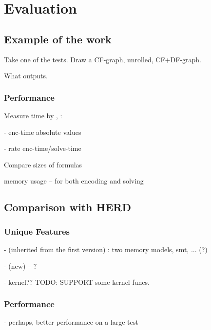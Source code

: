 \chapter{Evaluation}
\label{ch:eval}


\section{Example of the work}
Take one of the tests. Draw a CF-graph, unrolled, CF+DF-graph.

What outputs.


\subsection{Performance}

Measure time by \porthos[1], \porthos[2]:

- enc-time absolute values

- rate enc-time/solve-time


Compare sizes of formulas


memory usage -- for both encoding and solving




\section{Comparison with HERD}

\subsection{Unique Features}

- (inherited from the first version) : two memory models, smt, ... (?)

- (new) -- ?

- kernel?? TODO: SUPPORT some kernel funcs.


\subsection{Performance}

- perhaps, better performance on a large test